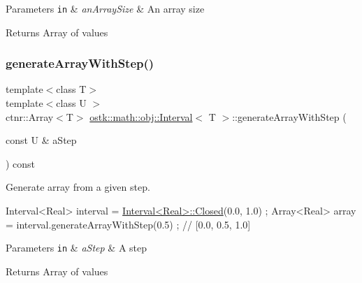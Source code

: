 \begin{DoxyParams}[1]{Parameters}
\mbox{\tt in}  & {\em an\+Array\+Size} & An array size \\
\hline
\end{DoxyParams}
\begin{DoxyReturn}{Returns}
Array of values 
\end{DoxyReturn}
\mbox{\label{classostk_1_1math_1_1obj_1_1_interval_acd986bb0a03df1584b8fb6e8d5e3b13c}} 
\subsubsection{\texorpdfstring{generate\+Array\+With\+Step()}{generateArrayWithStep()}}
{\footnotesize\ttfamily template$<$class T$>$ \\
template$<$class U $>$ \\
ctnr\+::\+Array$<$T$>$ \hyperlink{classostk_1_1math_1_1obj_1_1_interval}{ostk\+::math\+::obj\+::\+Interval}$<$ T $>$\+::generate\+Array\+With\+Step (\begin{DoxyParamCaption}\item[{const U \&}]{a\+Step }\end{DoxyParamCaption}) const}



Generate array from a given step. 


\begin{DoxyCode}
Interval<Real> interval = \hyperlink{classostk_1_1math_1_1obj_1_1_interval_a48e9f436e8994c49026a1ecd503bc190}{Interval<Real>::Closed}(0.0, 1.0) ;
Array<Real> array = interval.generateArrayWithStep(0.5) ; \textcolor{comment}{// [0.0, 0.5, 1.0]}
\end{DoxyCode}



\begin{DoxyParams}[1]{Parameters}
\mbox{\tt in}  & {\em a\+Step} & A step \\
\hline
\end{DoxyParams}
\begin{DoxyReturn}{Returns}
Array of values 
\end{DoxyReturn}
\mbox{\label{classostk_1_1math_1_1obj_1_1_interval_a80b12938523f90e7ec498f1cad88d244}} 
